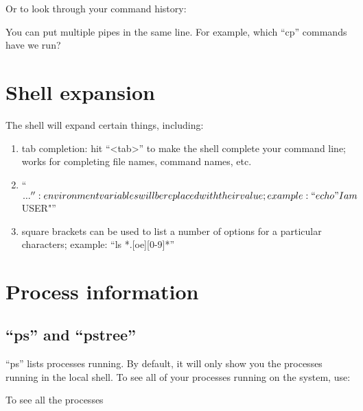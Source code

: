 Or to look through your command history:

\begin{prompt}
\end{prompt}

You can put multiple pipes in the same line. For example, which ``cp'' commands have we run?

\begin{prompt}
\end{prompt}

\section{Shell expansion}

The shell will expand certain things, including:

\begin{enumerate}
\tem ``*'' wildcard: for example ``ls t*txt'' will list all files starting with 't' and ending in 'txt'

\item tab completion: hit ``<tab>'' to make the shell complete your command line; works for completing file names, command names, etc.

\item ``${...}'': environment variables will be replaced with their value; example: ``echo "I am $USER"''

\item square brackets can be used to list a number of options for a particular characters; example: ``ls *.[oe][0-9]*''
\end{enumerate}

\section{Process information}

\subsection{``ps'' and ``pstree''}
``ps'' lists processes running. By default, it will only show you the processes running in the local shell. To see all of your processes running on the system, use:

\begin{prompt}
\end{prompt}

To see all the processes

